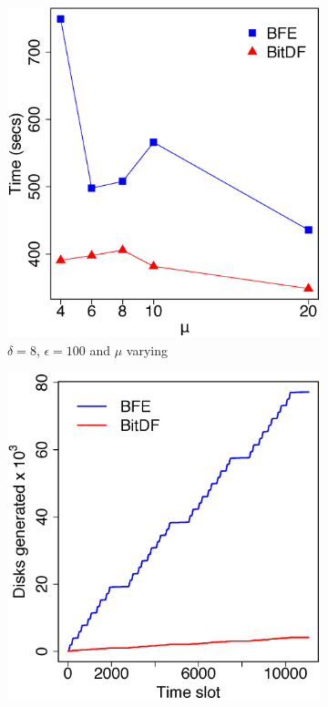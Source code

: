{\begin{figure}[h!]
    \begin{subfigure}[t]{0.48\textwidth}
        \includegraphics[width=\textwidth]{images/BerlinMOD_l_8_g_100_varying_n.eps}
        \caption{$\delta = 8$, $\epsilon = 100$ and $\mu$ varying}
        \label{fig:berlinmod_vary_n}
    \end{subfigure}
    \begin{subfigure}[t]{0.48\textwidth}
        \includegraphics[width=\textwidth]{images/BerlinMOD_d.eps}

\end{subfigure}
\end{figure}}
